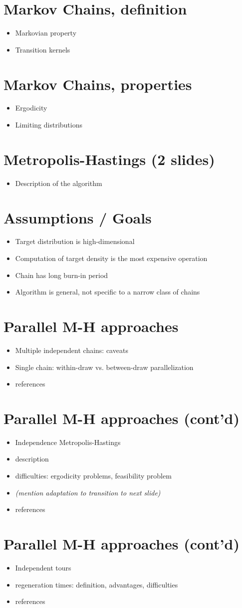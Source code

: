 \documentclass[11pt]{article}       %
\newenvironment{slide}[1]        {\section{#1} \begin{itemize}}%
                                 {\end{itemize}}
\begin{document}
\begin{slide}{Markov Chains, definition}
\item Markovian property
\item Transition kernels
\end{slide}

\begin{slide}{Markov Chains, properties}
\item Ergodicity
\item Limiting distributions
\end{slide} 

\begin{slide}{Metropolis-Hastings (2 slides)}
\item Description of the algorithm
\end{slide}

\begin{slide}{Assumptions / Goals}
\item Target distribution is high-dimensional 
\item Computation of target density is the most expensive operation
\item Chain has long burn-in period
\item Algorithm is general, not specific to a narrow class of chains
\end{slide}

\begin{slide}{Parallel M-H approaches}
\item Multiple independent chains: caveats
\item Single chain: within-draw vs. between-draw parallelization
\item references
\end{slide}

\begin{slide}{Parallel M-H approaches (cont'd)}
\item Independence Metropolis-Hastings
\item description
\item difficulties: ergodicity problems, feasibility problem
\item \emph{(mention adaptation to transition to next slide)}
\item references
\end{slide}

\begin{slide}{Parallel M-H approaches (cont'd)}
\item Independent tours
\item regeneration times: definition, advantages, difficulties
\item references
\end{slide}
\end{document}
